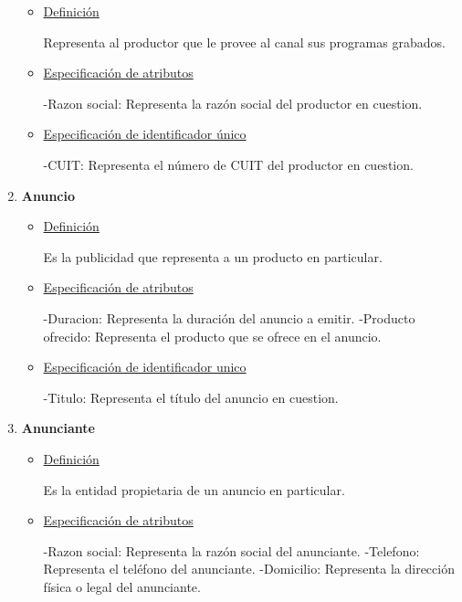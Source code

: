 \documentclass[a4paper,10pt,titlepage]{article}
\begin{document}
\begin{enumerate}
\begin{itemize}
\item \underline{Definici\'on}

Representa al productor que le provee al canal sus programas grabados.

\item \underline{Especificaci\'on de atributos}

-Razon social: Representa la raz\'on social del productor en cuestion.

\item \underline{Especificaci\'on de identificador \'unico}

-CUIT: Representa el n\'umero de CUIT del productor en cuestion.

\end{itemize}


\item {\bf Anuncio}

\begin{itemize}

\item \underline{Definici\'on}

Es la publicidad que representa a un producto en particular.

\item \underline{Especificaci\'on de atributos}

-Duracion: Representa la duraci\'on del anuncio a emitir.
-Producto ofrecido: Representa el producto que se ofrece en el anuncio.

\item \underline{Especificaci\'on de identificador unico}

-Titulo: Representa el t\'itulo del anuncio en cuestion.

\end{itemize}


\item {\bf Anunciante}

\begin{itemize}

\item \underline{Definici\'on}

Es la entidad propietaria de un anuncio en particular. 

\item \underline{Especificaci\'on de atributos}

-Razon social: Representa la raz\'on social del anunciante.
-Telefono: Representa el tel\'efono del anunciante.
-Domicilio: Representa la direcci\'on f\'isica o legal del anunciante.


\end{itemize}
\end{enumerate}
\end{document}

